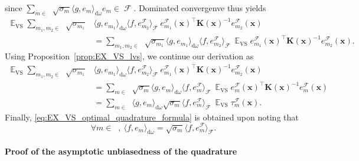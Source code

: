 \documentclass[twoside,11pt]{book}
\DeclareMathOperator{\VS}{\mathrm{VS}}
\DeclareMathOperator{\Tran}{\intercal}
\DeclareMathOperator{\EX}{\mathbb{E}}
\DeclareMathOperator{\F}{\mathcal{F}}
\DeclareMathOperator{\Ns}{\mathbb{N}^{*}}
\begin{document}
since $\sum_{m \in \Ns} \sqrt{\sigma_{m}}\langle g,e_{m} \rangle_{\mathrm{d}\omega} e_{m} \in \F$.
Dominated convergenve thus yields
\begin{align}
\EX_{\VS} \sum\limits_{m_{1},m_{2} \in \Ns} \sqrt{\sigma_{m_{1}}} & \langle g, e_{m_{1}} \rangle_{\mathrm{d}\omega}  \langle f, e_{m_{2}}^{\F} \rangle_{\F} \:e_{m_{1}}^{\F}(\bm{x})^{\Tran} \bm{K}(\bm{x})^{-1}e_{m_{2}}^{\F}(\bm{x}) \\
& = \sum\limits_{m_{1},m_{2} \in \Ns} \sqrt{\sigma_{m_{1}}} \langle g, e_{m_{1}} \rangle_{\mathrm{d}\omega}  \langle f, e_{m_{2}}^{\F} \rangle_{\F} \:\EX_{\VS} e_{m_{1}}^{\F}(\bm{x})^{\Tran} \bm{K}(\bm{x})^{-1}e_{m_{2}}^{\F}(\bm{x}).
\end{align}
Using Proposition~\ref{prop:EX_VS_lvs}, we continue our derivation as
\begin{align}
\EX_{\VS} \sum\limits_{m_{1},m_{2} \in \Ns} \sqrt{\sigma_{m_{1}}} & \langle g, e_{m_{1}} \rangle_{\mathrm{d}\omega}  \langle f, e_{m_{2}}^{\F} \rangle_{\F} \: e_{m_{1}}^{\F}(\bm{x})^{\Tran} \bm{K}(\bm{x})^{-1}e_{m_{2}}^{\F}(\bm{x}) \\
& = \sum\limits_{m \in \Ns} \sqrt{\sigma_{m}} \langle g, e_{m} \rangle_{\mathrm{d}\omega}  \langle f, e_{m}^{\F} \rangle_{\F} \: \EX_{\VS} e_{m}^{\F}(\bm{x})^{\Tran} \bm{K}(\bm{x})^{-1}e_{m}^{\F}(\bm{x})\\
& = \sum\limits_{m \in \Ns}  \langle g, e_{m} \rangle_{\mathrm{d}\omega}  \sqrt{\sigma_{m}}\langle f, e_{m}^{\F} \rangle_{\F} \: \EX_{\VS} \tau_{m}^{\F}(\bm{x}).
\end{align}
Finally, \eqref{eq:EX_VS_optimal_quadrature_formula} is obtained upon noting that
\begin{equation}
\forall m \in \Ns, \: \langle f,e_{m} \rangle_{\mathrm{d}\omega} = \sqrt{\sigma_{m}} \langle f,e_{m}^{\F} \rangle_{\F}.
\end{equation}
\paragraph{Proof of the asymptotic unbiasedness of the quadrature }
\end{document}

